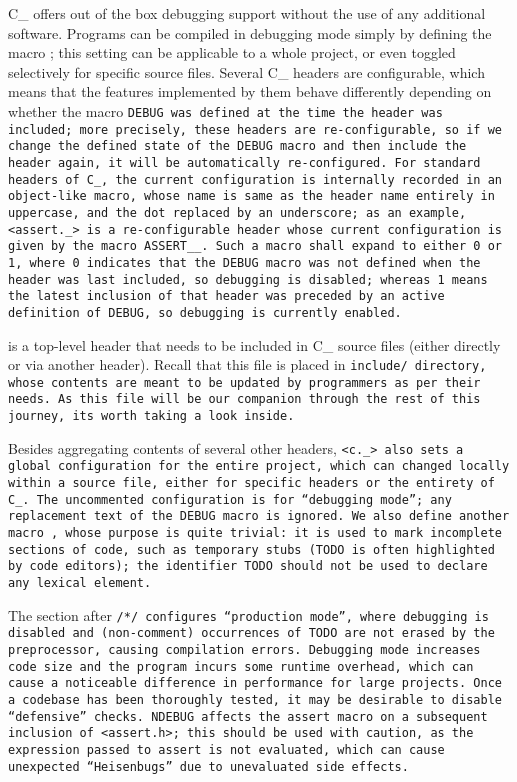 C\_ offers out of the box debugging support
without the use of any additional software.
Programs can be compiled in debugging mode simply by defining the
macro ; this setting can be applicable to a whole project,
or even toggled selectively for specific source files.
Several C\_ headers are configurable,
which means that the features implemented by them behave differently depending
on whether the macro \tt{DEBUG} was defined at the time the header was included;
more precisely, these headers are re-configurable, so if we change the
\tt{defined} state of the \tt{DEBUG} macro and then include the header again,
it will be automatically re-configured.
For standard headers of C\_,
the current configuration is internally recorded in an object-like macro,
whose name is same as the header name entirely in uppercase,
and the dot replaced by an underscore;
as an example, \tt{<assert._>} is a re-configurable header
whose current configuration is given by the macro \tt{ASSERT__}.
Such a macro shall expand to either 0 or 1,
where 0 indicates that the \tt{DEBUG} macro was not defined
when the header was last included, so debugging is disabled;
whereas 1 means the latest inclusion of that header was preceded by
an active definition of \tt{DEBUG}, so debugging is currently enabled.

 is a top-level header that needs to be included in
C\_ source files (either directly or via another header).
Recall that this file is placed in \tt{include/} directory,
whose contents are meant to be updated by programmers as per their needs.
As this file will be our companion through the rest of this journey,
its worth taking a look inside.


Besides aggregating contents of several other headers,
\tt{<c._>} also sets a global configuration for the entire project,
which can changed locally within a source file,
either for specific headers or the entirety of C\_.
The uncommented configuration is for ``debugging mode'';
any replacement text of the \tt{DEBUG} macro is ignored.
We also define another macro , whose purpose is quite trivial:
it is used to mark incomplete sections of code, such as temporary stubs
(\tt{TODO} is often highlighted by code editors);
the identifier \tt{TODO} should not be used to declare any lexical element.

The section after \tt{/*/} configures ``production mode'', where debugging is
disabled and (non-comment) occurrences of \tt{TODO} are
not erased by the preprocessor, causing compilation errors.
Debugging mode increases code size and the program incurs some runtime overhead,
which can cause a noticeable difference in performance for large projects.
Once a codebase has been thoroughly tested,
it may be desirable to disable ``defensive'' checks.
\tt{NDEBUG} affects the \tt{assert} macro
on a subsequent inclusion of \tt{<assert.h>};
this should be used with caution,
as the expression passed to \tt{assert} is not evaluated,
which can cause unexpected ``Heisenbugs'' due to unevaluated side effects.


